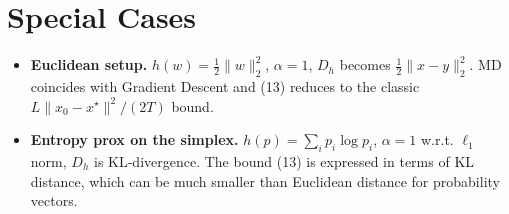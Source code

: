 \documentclass{article}
\newcommand{\Breg}{D_h}
\begin{document}
\section*{Special Cases}
\begin{itemize}
\item \textbf{Euclidean setup.} $h(w)=\frac12\|w\|_{2}^{2}$, $\alpha=1$, $\Breg$ becomes $\frac12\|x-y\|_{2}^{2}$. MD coincides with Gradient Descent and (13) reduces to the classic $L\|x_0-x^\star\|^{2}/(2T)$ bound.
\item \textbf{Entropy prox on the simplex.} $h(p)=\sum_{i}p_i\log p_i$, $\alpha=1$ w.r.t. $\ell_1$ norm, $\Breg$ is KL‑divergence. The bound (13) is expressed in terms of KL distance, which can be much smaller than Euclidean distance for probability vectors.
\end{itemize}
\end{document}

